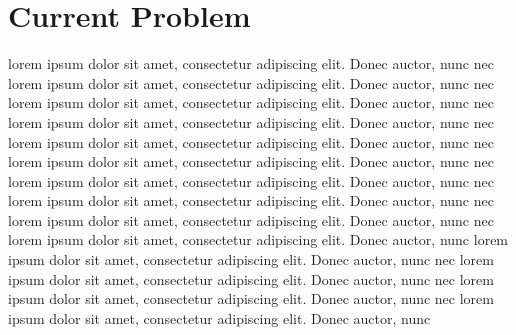 \section{Current Problem} \label{current problem}
lorem ipsum dolor sit amet, consectetur adipiscing elit. Donec auctor, nunc nec lorem ipsum dolor sit amet, consectetur adipiscing elit. Donec auctor, nunc
nec lorem ipsum dolor sit amet, consectetur adipiscing elit. Donec auctor, nunc nec lorem ipsum dolor sit amet, consectetur adipiscing elit. Donec auctor, nunc
nec lorem ipsum dolor sit amet, consectetur adipiscing elit. Donec auctor, nunc nec lorem ipsum dolor sit amet, consectetur adipiscing elit. Donec auctor, nunc
nec lorem ipsum dolor sit amet, consectetur adipiscing elit. Donec auctor, nunc nec lorem ipsum dolor sit amet, consectetur adipiscing elit. Donec auctor, nunc
nec lorem ipsum dolor sit amet, consectetur adipiscing elit. Donec auctor, nunc nec lorem ipsum dolor sit amet, consectetur adipiscing elit. Donec auctor, nunc
lorem ipsum dolor sit amet, consectetur adipiscing elit. Donec auctor, nunc nec lorem ipsum dolor sit amet, consectetur adipiscing elit. Donec auctor, nunc
nec lorem ipsum dolor sit amet, consectetur adipiscing elit. Donec auctor, nunc nec lorem ipsum dolor sit amet, consectetur adipiscing elit. Donec auctor, nunc

